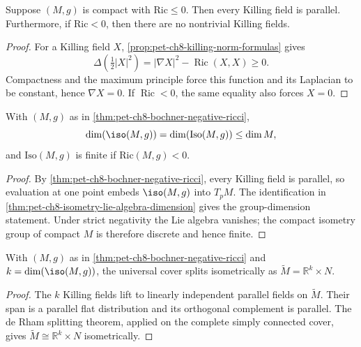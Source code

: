 \begin{theorem}
  \label{thm:pet-ch8-bochner-negative-ricci}

  Suppose $(M,g)$ is compact with $\mathrm{Ric}\le0$. Then every Killing field
  is parallel. Furthermore, if $\mathrm{Ric}<0$, then there are no nontrivial
  Killing fields.
\end{theorem}
\begin{proof}
  \sketch
  For a Killing field \(X\), \cref{prop:pet-ch8-killing-norm-formulas} gives
  \[
    \Delta\!\left(\tfrac12|X|^2\right)
    =|\nabla X|^2-\operatorname{Ric}(X,X)\ge0.
  \]
  Compactness and the maximum principle force this function and its Laplacian
  to be constant, hence \(\nabla X=0\). If \(\operatorname{Ric}<0\), the same
  equality also forces \(X=0\).
\end{proof}

\begin{corollary}
  \label{cor:pet-ch8-isometry-dimension-bound-negative-ricci}

  With $(M,g)$ as in \cref{thm:pet-ch8-bochner-negative-ricci},
  \[
    \dim(\iso(M,g))=\dim(\mathrm{Iso}(M,g))\le\dim M,
  \]
  and $\mathrm{Iso}(M,g)$ is finite if $\mathrm{Ric}(M,g)<0$.
\end{corollary}
\begin{proof}
  \sketch
  By \cref{thm:pet-ch8-bochner-negative-ricci}, every Killing field is
  parallel, so evaluation at one point embeds \(\iso(M,g)\) into \(T_pM\).
  The identification in
  \cref{thm:pet-ch8-isometry-lie-algebra-dimension} gives the group-dimension
  statement. Under strict negativity the Lie algebra vanishes; the compact
  isometry group of compact \(M\) is therefore discrete and hence finite.
\end{proof}

\begin{corollary}
  \label{cor:pet-ch8-splitting-negative-ricci}

  With $(M,g)$ as in \cref{thm:pet-ch8-bochner-negative-ricci} and
  $k=\dim(\iso(M,g))$, the universal cover splits isometrically as
  $\widetilde M=\mathbb{R}^k\times N$.
\end{corollary}
\begin{proof}
  \sketch
  The \(k\) Killing fields lift to linearly independent parallel fields on
  \(\widetilde M\). Their span is a parallel flat distribution and its
  orthogonal complement is parallel. The de Rham splitting theorem, applied
  on the complete simply connected cover, gives
  \(\widetilde M\cong\mathbb{R}^k\times N\) isometrically.
\end{proof}

